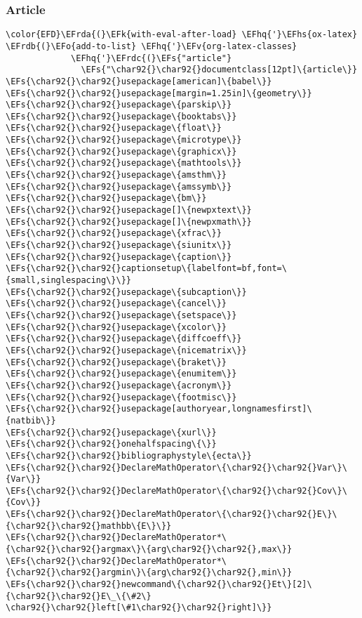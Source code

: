 \documentclass[12pt]{article}
\theoremstyle{plain}%
\theoremstyle{definition}
\theoremstyle{remark}
\newcommand{\EFs}[1]{\textcolor{EFs}{#1}} %
\newcommand{\EFk}[1]{\textcolor{EFk}{#1}} %
\newcommand{\EFv}[1]{\textcolor{EFv}{#1}} %
\newcommand{\EFo}[1]{\textcolor{EFo}{#1}} %
\newcommand{\EFhq}[1]{\textcolor{EFhq}{#1}} %
\newcommand{\EFhs}[1]{\textcolor{EFhs}{#1}} %
\newcommand{\EFrda}[1]{\textcolor{EFrda}{#1}} %
\newcommand{\EFrdb}[1]{\textcolor{EFrdb}{#1}} %
\newcommand{\EFrdc}[1]{\textcolor{EFrdc}{#1}} %
\begin{document}
\subsubsection{Article}
\label{sec:org14a8788}
\begin{Code}
\begin{Verbatim}
\color{EFD}\EFrda{(}\EFk{with-eval-after-load} \EFhq{'}\EFhs{ox-latex}
\EFrdb{(}\EFo{add-to-list} \EFhq{'}\EFv{org-latex-classes}
             \EFhq{'}\EFrdc{(}\EFs{"article"}
               \EFs{"\char92{}\char92{}documentclass[12pt]\{article\}}
\EFs{\char92{}\char92{}usepackage[american]\{babel\}}
\EFs{\char92{}\char92{}usepackage[margin=1.25in]\{geometry\}}
\EFs{\char92{}\char92{}usepackage\{parskip\}}
\EFs{\char92{}\char92{}usepackage\{booktabs\}}
\EFs{\char92{}\char92{}usepackage\{float\}}
\EFs{\char92{}\char92{}usepackage\{microtype\}}
\EFs{\char92{}\char92{}usepackage\{graphicx\}}
\EFs{\char92{}\char92{}usepackage\{mathtools\}}
\EFs{\char92{}\char92{}usepackage\{amsthm\}}
\EFs{\char92{}\char92{}usepackage\{amssymb\}}
\EFs{\char92{}\char92{}usepackage\{bm\}}
\EFs{\char92{}\char92{}usepackage[]\{newpxtext\}}
\EFs{\char92{}\char92{}usepackage[]\{newpxmath\}}
\EFs{\char92{}\char92{}usepackage\{xfrac\}}
\EFs{\char92{}\char92{}usepackage\{siunitx\}}
\EFs{\char92{}\char92{}usepackage\{caption\}}
\EFs{\char92{}\char92{}captionsetup\{labelfont=bf,font=\{small,singlespacing\}\}}
\EFs{\char92{}\char92{}usepackage\{subcaption\}}
\EFs{\char92{}\char92{}usepackage\{cancel\}}
\EFs{\char92{}\char92{}usepackage\{setspace\}}
\EFs{\char92{}\char92{}usepackage\{xcolor\}}
\EFs{\char92{}\char92{}usepackage\{diffcoeff\}}
\EFs{\char92{}\char92{}usepackage\{nicematrix\}}
\EFs{\char92{}\char92{}usepackage\{braket\}}
\EFs{\char92{}\char92{}usepackage\{enumitem\}}
\EFs{\char92{}\char92{}usepackage\{acronym\}}
\EFs{\char92{}\char92{}usepackage\{footmisc\}}
\EFs{\char92{}\char92{}usepackage[authoryear,longnamesfirst]\{natbib\}}
\EFs{\char92{}\char92{}usepackage\{xurl\}}
\EFs{\char92{}\char92{}onehalfspacing\{\}}
\EFs{\char92{}\char92{}bibliographystyle\{ecta\}}
\EFs{\char92{}\char92{}DeclareMathOperator\{\char92{}\char92{}Var\}\{Var\}}
\EFs{\char92{}\char92{}DeclareMathOperator\{\char92{}\char92{}Cov\}\{Cov\}}
\EFs{\char92{}\char92{}DeclareMathOperator\{\char92{}\char92{}E\}\{\char92{}\char92{}mathbb\{E\}\}}
\EFs{\char92{}\char92{}DeclareMathOperator*\{\char92{}\char92{}argmax\}\{arg\char92{}\char92{},max\}}
\EFs{\char92{}\char92{}DeclareMathOperator*\{\char92{}\char92{}argmin\}\{arg\char92{}\char92{},min\}}
\EFs{\char92{}\char92{}newcommand\{\char92{}\char92{}Et\}[2]\{\char92{}\char92{}E\_\{\#2\} \char92{}\char92{}left[\#1\char92{}\char92{}right]\}}

\end{Verbatim}
\end{Code}
\end{document}

